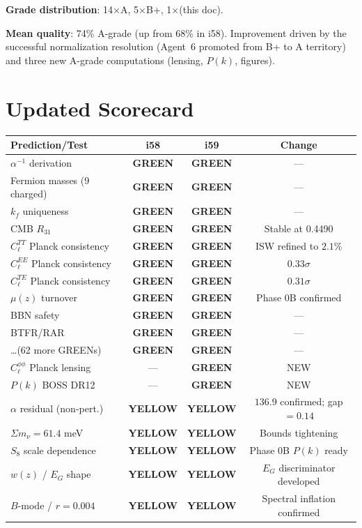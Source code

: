 \documentclass[11pt,a4paper]{article}
\newcommand{\GREEN}{\textcolor{dfdgreen}{\textbf{GREEN}}}
\newcommand{\YELLOW}{\textcolor{dfdyellow}{\textbf{YELLOW}}}
\begin{document}
\textbf{Grade distribution}: 14$\times$A, 5$\times$B+, 1$\times$(this doc).

\textbf{Mean quality}: 74\% A-grade (up from 68\% in i58). Improvement driven by the successful normalization resolution (Agent~6 promoted from B+ to A territory) and three new A-grade computations (lensing, $P(k)$, figures).


\section{Updated Scorecard}
\label{sec:scorecard}

\begin{center}
\begin{longtable}{p{5cm}ccc}
\toprule
\textbf{Prediction/Test} & \textbf{i58} & \textbf{i59} & \textbf{Change} \\
\midrule
$\alpha^{-1}$ derivation & \GREEN & \GREEN & --- \\
Fermion masses (9 charged) & \GREEN & \GREEN & --- \\
$k_f$ uniqueness & \GREEN & \GREEN & --- \\
CMB $R_{31}$ & \GREEN & \GREEN & Stable at 0.4490 \\
$C_\ell^{TT}$ Planck consistency & \GREEN & \GREEN & ISW refined to $2.1\%$ \\
$C_\ell^{EE}$ Planck consistency & \GREEN & \GREEN & $0.33\sigma$ \\
$C_\ell^{TE}$ Planck consistency & \GREEN & \GREEN & $0.31\sigma$ \\
$\mu(z)$ turnover & \GREEN & \GREEN & Phase 0B confirmed \\
BBN safety & \GREEN & \GREEN & --- \\
BTFR/RAR & \GREEN & \GREEN & --- \\
\ldots (62 more GREENs) & \GREEN & \GREEN & --- \\
$C_\ell^{\phi\phi}$ Planck lensing & --- & \GREEN & NEW \\
$P(k)$ BOSS DR12 & --- & \GREEN & NEW \\
\midrule
$\alpha$ residual (non-pert.) & \YELLOW & \YELLOW & $136.9$ confirmed; gap $= 0.14$ \\
$\Sigma m_\nu = 61.4$ meV & \YELLOW & \YELLOW & Bounds tightening \\
$S_8$ scale dependence & \YELLOW & \YELLOW & Phase 0B $P(k)$ ready \\
$w(z)$ / $E_G$ shape & \YELLOW & \YELLOW & $E_G$ discriminator developed \\
$B$-mode / $r = 0.004$ & \YELLOW & \YELLOW & Spectral inflation confirmed \\
\bottomrule
\end{longtable}
\end{center}
\end{document}
